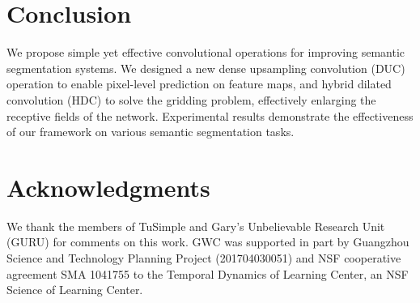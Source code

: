 \documentclass[10pt,twocolumn,letterpaper]{article}
\begin{document}
\section{Conclusion}
We propose simple yet effective convolutional operations for improving semantic segmentation systems. We designed a new dense upsampling convolution (DUC) operation to enable pixel-level prediction on feature maps, and hybrid dilated convolution (HDC) to solve the gridding problem, effectively enlarging the receptive fields of the network. Experimental results demonstrate the effectiveness of our framework on various semantic segmentation tasks.

\section{Acknowledgments}
We thank the members of TuSimple and Gary's Unbelievable Research Unit (GURU) for comments on this work. GWC was supported in part by Guangzhou Science and Technology Planning Project (201704030051) and NSF cooperative agreement SMA 1041755 to the Temporal Dynamics of Learning Center, an NSF Science of Learning Center. 


{\small


}
\end{document}
